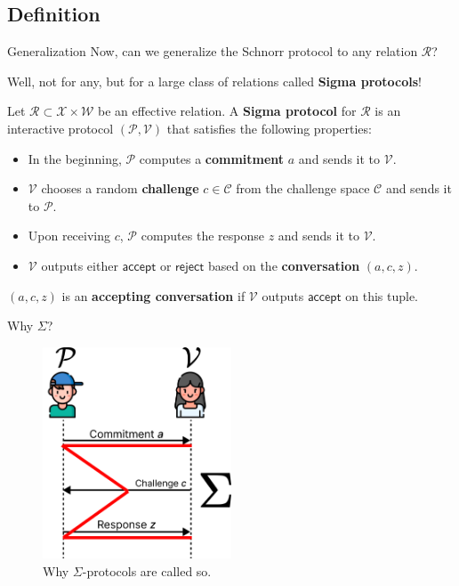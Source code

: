 \documentclass[xcolor={usenames,dvipsnames}]{beamer}
\begin{document}
    \subsection{Definition}
    \begin{frame}{Generalization}
        Now, can we generalize the Schnorr protocol to any relation $\mathcal{R}$?\pause

        Well, not for any, but for a large class of relations called \textbf{Sigma protocols}!\pause

        \begin{definition}
            Let $\mathcal{R} \subset \mathcal{X} \times \mathcal{W}$ be an effective relation. A \textbf{Sigma protocol} for $\mathcal{R}$ is an interactive protocol $(\mathcal{P}, \mathcal{V})$ that satisfies the following properties:\pause
            \begin{itemize}
                \item In the beginning, $\mathcal{P}$ computes a \textbf{commitment} $a$ and sends it to $\mathcal{V}$.\pause
                \item $\mathcal{V}$ chooses a random \textbf{challenge} $c \in \mathcal{C}$ from the challenge space $\mathcal{C}$ and sends it to $\mathcal{P}$.\pause
                \item Upon receiving $c$, $\mathcal{P}$ computes the response $z$ and sends it to $\mathcal{V}$.\pause
                \item $\mathcal{V}$ outputs either $\mathsf{accept}$ or $\mathsf{reject}$ based on the \textbf{conversation} $(a,c,z)$.\pause
            \end{itemize}
        \end{definition}

        \begin{definition}
            $(a,c,z)$ is an \textbf{accepting conversation} if $\mathcal{V}$ outputs $\mathsf{accept}$ on this tuple.
        \end{definition}
    \end{frame}

    \begin{frame}{Why $\Sigma$?}
        \begin{figure}
        \centering
            \includegraphics[width=0.5\textwidth]{images/lecture_7/sigma_protocol_illustration.pdf}
            \caption{Why $\Sigma$-protocols are called so.}
        \end{figure}
    \end{frame}
\end{document}
